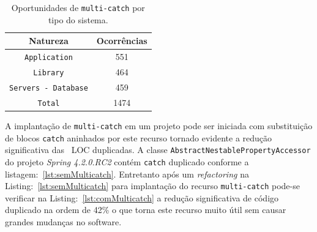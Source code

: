 \begin{table}[h]
	\centering
	\caption{Oportunidades de \texttt{multi-catch} por tipo do sistema.}
	\begin{tabular}{cc}
		\hline
		Natureza & Ocorrências \\ 
		\hline \hline
		\texttt{Application} & 551 \\ 
		\texttt{Library} &  464 \\ 
		\texttt{Servers - Database} &  459 \\ \hline
		\texttt{Total} &  1474 \\ \hline
	\end{tabular}
	\label{tab:oportunidadesMulticatch} %
\end{table}
		
A implantação de \texttt{multi-catch} em um projeto pode ser iniciada com substituição de blocos \texttt{catch} aninhados por este recurso tornado evidente a redução significativa das ~\acs{LOC} duplicadas. A classe \texttt{AbstractNestablePropertyAccessor} do projeto  \textit{Spring 4.2.0.RC2} contém \texttt{catch} duplicado conforme a listagem:~\ref{lst:semMulticatch}. Entretanto após um \textit{refactoring} na Listing:~\ref{lst:semMulticatch} para implantação do recurso \texttt{multi-catch} pode-se verificar na Listing:~\ref{lst:comMulticatch} a redução significativa de código duplicado na ordem de \num{42}\% o que torna este recurso muito útil sem causar grandes mudanças no software.


